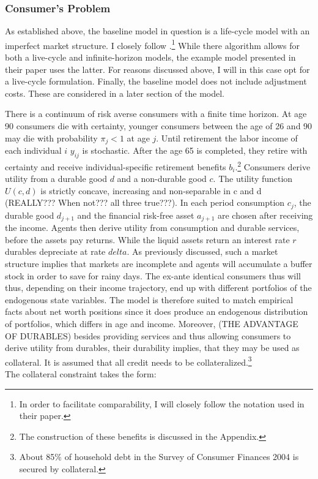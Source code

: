 \documentclass[a4paper,12pt]{article}
\begin{document}
\subsubsection{Consumer's Problem}
As established above, the baseline model in question is a life-cycle model with an imperfect market structure. I closely follow \cite{hintermaier2010}.\footnote{In order to facilitate comparability, I will closely follow the notation used in their paper.} While there algorithm allows for both a live-cycle and infinite-horizon models, the example model presented in their paper uses the latter. For reasons discussed above, I will in this case opt for a live-cycle formulation. Finally, the baseline model does not include adjustment costs. These are considered in a later section of the model. 

There is a continuum of risk averse consumers with a finite time horizon. 
At age 90 consumers die with certainty, younger consumers between the age of 26 and 90 may die with probability $\pi_{j} < 1$ at age $j$. Until retirement the labor income of each individual $i$ $y_{ij}$ is stochastic. After the age 65 is completed, they retire with certainty and receive individual-specific retirement benefits $b_{i}$.\footnote{The construction of these benefits is discussed in the Appendix.}
Consumers derive utility from a durable good $d$ and a non-durable good $c$. The utility function $U(c,d)$ is strictly concave, increasing and non-separable in c and d (REALLY??? When not??? all three true???). 
In each period consumption $c_{j}$, the durable good $d_{j+1}$ and the financial risk-free asset $a_{j+1}$ are chosen after receiving the income. Agents then derive utility from consumption and durable services, before the assets pay returns. While the liquid assets return an interest rate $r$ durables depreciate at rate $delta$. As previously discussed, such a market structure implies that markets are incomplete and agents will accumulate a buffer stock in order to save for rainy days. The ex-ante identical consumers thus will thus, depending on their income trajectory, end up with different portfolios of the endogenous state variables. The model is therefore suited to match empirical facts about net worth positions since it does produce an endogenous distribution of portfolios, which differs in age and income. Moreover, (THE ADVANTAGE OF DURABLES) besides providing services and thus allowing consumers to derive utility from durables, their durability implies, that they may be used as collateral. It is assumed that all credit needs to be collateralized.\footnote{About 85\% of household debt in the Survey of Consumer Finances 2004 is secured by collateral.\citep{hintermaier2010}} 
\\
The collateral constraint takes the form:
\end{document}
